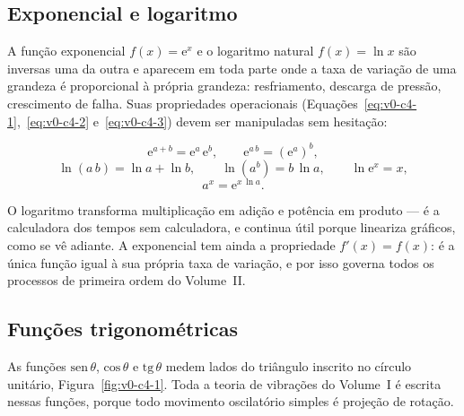 \documentclass[12pt,a4paper]{article}
\numberwithin{equation}{section}
\numberwithin{table}{section}
\numberwithin{figure}{section}
\begin{document}
\subsection{Exponencial e logaritmo}

A função exponencial $f(x) = \mathrm{e}^{x}$ e o logaritmo natural
$f(x) = \ln x$ são inversas uma da outra e aparecem em toda parte onde a
taxa de variação de uma grandeza é proporcional à própria grandeza:
resfriamento, descarga de pressão, crescimento de falha. Suas propriedades
operacionais (Equações~\eqref{eq:v0-c4-1},~\eqref{eq:v0-c4-2}
e~\eqref{eq:v0-c4-3}) devem ser manipuladas sem hesitação:

\begin{equation}\label{eq:v0-c4-1}
\mathrm{e}^{a+b} = \mathrm{e}^{a}\,\mathrm{e}^{b},
\qquad
\mathrm{e}^{a\,b} = \left(\mathrm{e}^{a}\right)^{b},
\end{equation}
\begin{equation}\label{eq:v0-c4-2}
\ln(a\,b) = \ln a + \ln b,
\qquad
\ln(a^{b}) = b\,\ln a,
\qquad
\ln \mathrm{e}^{x} = x,
\end{equation}
\begin{equation}\label{eq:v0-c4-3}
a^{x} = \mathrm{e}^{x\,\ln a}.
\end{equation}

O logaritmo transforma multiplicação em adição e potência em produto ---
é a calculadora dos tempos sem calculadora, e continua útil porque
lineariza gráficos, como se vê adiante. A exponencial tem ainda a
propriedade $f'(x) = f(x)$: é a única função igual à sua própria taxa de
variação, e por isso governa todos os processos de primeira ordem do
Volume~II.

\subsection{Funções trigonométricas}

As funções $\mathrm{sen}\,\theta$, $\mathrm{cos}\,\theta$ e
$\mathrm{tg}\,\theta$ medem lados do triângulo inscrito no círculo unitário,
Figura~\ref{fig:v0-c4-1}. Toda a teoria de vibrações do Volume~I é escrita
nessas funções, porque todo movimento oscilatório simples é projeção de
rotação.
\end{document}

